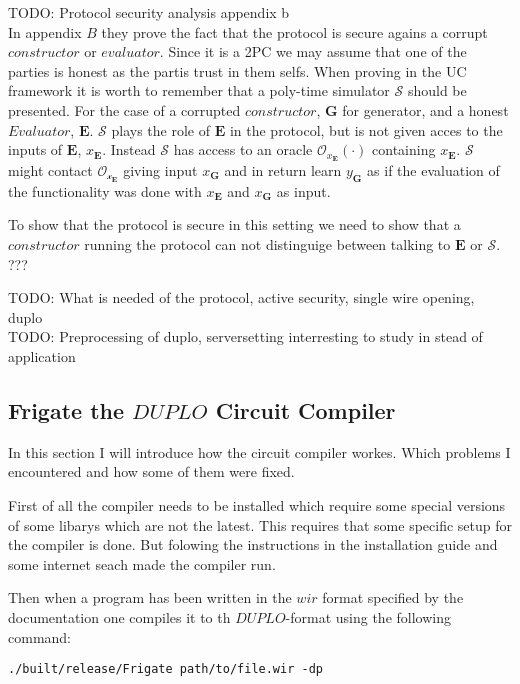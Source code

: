 \documentclass[twoside,11pt,openright]{report}
\newcommand{\todo}[1]{}
\renewcommand{\todo}[1]{{\color{red} TODO: {#1}} \\}
\begin{document}
\todo{Protocol security analysis appendix b}
In appendix $B$ they prove the fact that the protocol is secure agains a corrupt $constructor$ or $evaluator$. Since it is a 2PC we may assume that one of the parties is honest as the partis trust in them selfs. When proving in the UC framework it is worth to remember that a poly-time simulator $\mathcal{S}$ should be presented. For the case of a corrupted $constructor$, $\mathbf{G}$ for generator, and a honest $Evaluator$, $\mathbf{E}$. $\mathcal{S}$ plays the role of $\mathbf{E}$ in the protocol, but is not given acces to the inputs of $\mathbf{E}$, $x_{\mathbf{E}}$. Instead $\mathcal{S}$ has access to an oracle $\mathcal{O}_{x_{\mathbf{E}}}(\cdot)$ containing $x_{\mathbf{E}}$. $\mathcal{S}$ might contact $\mathcal{O_{x_{\mathbf{E}}}}$ giving input $x_{\mathbf{G}}$ and in return learn $y_{\mathbf{G}}$ as if the evaluation of the functionality was done with $x_{\mathbf{E}}$ and $x_{\mathbf{G}}$ as input.

To show that the protocol is secure in this setting we need to show that a $constructor$ running the protocol can not distinguige between talking to $\mathbf{E}$ or $\mathcal{S}$. ???  

\todo{What is needed of the protocol, active security, single wire opening, duplo}

\todo{Preprocessing of duplo, serversetting interresting to study in stead of application}

\subsection{Frigate the $DUPLO$ Circuit Compiler}
In this section I will introduce how the circuit compiler workes. Which problems I encountered and how some of them were fixed. 

First of all the compiler needs to be installed which require some special versions of some libarys which are not the latest. This requires that some specific setup for the compiler is done. But folowing the instructions in the installation guide and some internet seach made the compiler run.

Then when a program has been written in the $wir$ format specified by the documentation one compiles it to th $DUPLO$-format using the following command:

\begin{center}
\begin{verbatim}
./built/release/Frigate path/to/file.wir -dp
\end{verbatim}
\end{center}
\end{document}
